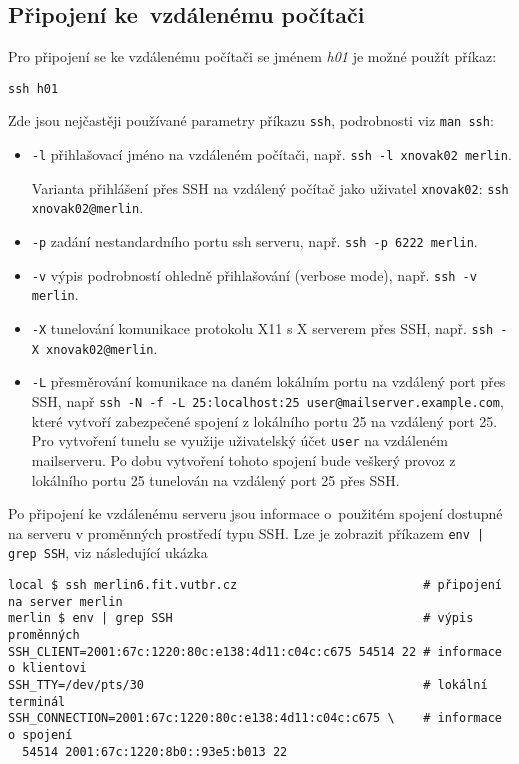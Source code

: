 \subsection{Připojení ke~vzdálenému počítači}
Pro připojení se ke vzdálenému počítači se jménem \emph{h01} je možné použít příkaz:
\begin{verbatim}
ssh h01
\end{verbatim}
Zde jsou nejčastěji používané parametry příkazu {\tt ssh}, podrobnosti viz {\tt man ssh}:
\begin{itemize}
  \item {\tt -l} přihlašovací jméno na vzdáleném počítači, např. {\tt ssh -l xnovak02 merlin}.

  Varianta přihlášení přes SSH na vzdálený počítač jako uživatel {\tt xnovak02}: \verb|ssh xnovak02@merlin|.
  \item {\tt -p} zadání nestandardního portu ssh serveru, např. {\tt ssh -p 6222 merlin}.
  \item {\tt -v} výpis podrobností ohledně přihlašování (verbose mode), např. {\tt ssh -v merlin}.
  \item {\tt -X} tunelování komunikace protokolu X11  s X serverem přes SSH, např. {\tt ssh -X xnovak02@merlin}.
  \item {\tt -L} přesměrování komunikace na daném lokálním portu na vzdálený port přes SSH, např {\tt ssh -N -f -L 25:localhost:25 user@mailserver.example.com}, které vytvoří zabezpečené spojení z lokálního portu 25 na vzdálený port 25. Pro vytvoření tunelu se využije uživatelský účet {\tt user} na vzdáleném mailserveru. Po dobu vytvoření tohoto spojení bude veškerý provoz z lokálního portu 25 tunelován na vzdálený port 25 přes SSH. 
\end{itemize}
 
Po připojení ke vzdálenému serveru jsou informace o~použitém spojení dostupné na serveru v proměnných prostředí typu SSH.  Lze je zobrazit  příkazem {\tt env | grep SSH}, viz následující ukázka
\begin{verbatim}
local $ ssh merlin6.fit.vutbr.cz                          # připojení na server merlin
merlin $ env | grep SSH                                   # výpis proměnných
SSH_CLIENT=2001:67c:1220:80c:e138:4d11:c04c:c675 54514 22 # informace o klientovi
SSH_TTY=/dev/pts/30                                       # lokální terminál
SSH_CONNECTION=2001:67c:1220:80c:e138:4d11:c04c:c675 \    # informace o spojení
  54514 2001:67c:1220:8b0::93e5:b013 22
\end{verbatim}

